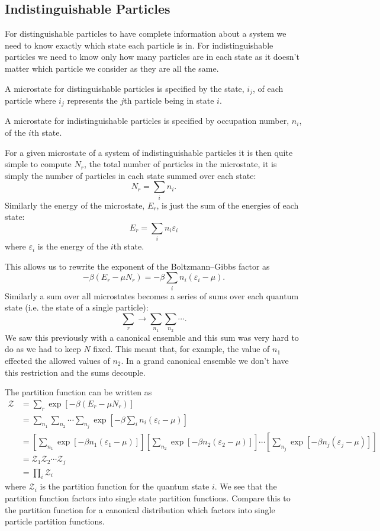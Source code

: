 \documentclass[a4paper]{article}
\newcommand{\partition}{\mathcal{Z}}
\newcounter{keypointcounter}
\newenvironment{keypoint}{%
    \stepcounter{keypointcounter}
    \begin{tcolorbox}[breakable, title=Key Point \thekeypointcounter]
}{%
    \end{tcolorbox}
}
\begin{document}
    \subsection{Indistinguishable Particles}\label{sec:indistinguishable particles}
    For distinguishable particles to have complete information about a system we need to know exactly which state each particle is in.
    For indistinguishable particles we need to know only how many particles are in each state as it doesn't matter which particle we consider as they are all the same.
    \begin{keypoint}
        A microstate for distinguishable particles is specified by the state, \(i_j\), of each particle where \(i_j\) represents the \(j\)th particle being in state \(i\).
        
        A microstate for indistinguishable particles is specified by occupation number, \(n_i\), of the \(i\)th state.
    \end{keypoint}
    For a given microstate of a system of indistinguishable particles it is then quite simple to compute \(N_r\), the total number of particles in the microstate, it is simply the number of particles in each state summed over each state:
    \[N_r = \sum_{i}n_i.\]
    Similarly the energy of the microstate, \(E_r\), is just the sum of the energies of each state:
    \[E_r = \sum_{i}n_i\varepsilon_i\]
    where \(\varepsilon_i\) is the energy of the \(i\)th state.
    
    This allows us to rewrite the exponent of the Boltzmann--Gibbs factor as
    \[-\beta(E_r - \mu N_r) = -\beta\sum_{i}n_i(\varepsilon_i - \mu).\]
    Similarly a sum over all microstates becomes a series of sums over each quantum state (i.e. the state of a single particle):
    \[\sum_r \to \sum_{n_1}\sum_{n_2}\dotsb.\]
    We saw this previously with a canonical ensemble and this sum was very hard to do as we had to keep \(N\) fixed.
    This meant that, for example, the value of \(n_1\) effected the allowed values of \(n_2\).
    In a grand canonical ensemble we don't have this restriction and the sums decouple.
    
    The partition function can be written as
    \begin{align*}
        \partition &= \sum_{r} \exp[-\beta(E_r - \mu N_r)]\\
        &= \sum_{n_1}\sum_{n_2}\dotsb \sum_{n_j}\exp\left[ -\beta\sum_{i} n_i(\varepsilon_i - \mu) \right]\\
        &= \left[ \sum_{n_1} \exp[-\beta n_1(\varepsilon_1 - \mu)] \right] \left[ \sum_{n_2} \exp[-\beta n_2(\varepsilon_2 - \mu)] \right] \dotsm \left[ \sum_{n_j} \exp[-\beta n_j(\varepsilon_j - \mu)] \right]\\
        &= \partition_1 \partition_2 \dotsm \partition_j\\
        &= \prod_{i}\partition_{i}
    \end{align*}
    where \(\partition_{i}\) is the partition function for the quantum state \(i\).
    We see that the partition function factors into single state partition functions.
    Compare this to the partition function for a canonical distribution which factors into single particle partition functions.
    
\end{document}
